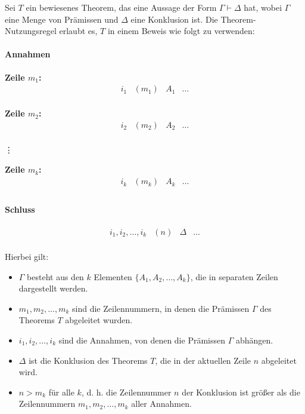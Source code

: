 \documentclass[main.tex]{subfiles}
\begin{document}
\begin{definition}
\label{theoremUsageRule}
Sei \( T \) ein bewiesenes Theorem, das eine Aussage der Form \( \Gamma \vdash \Delta \) hat, wobei \( \Gamma \) eine Menge von Prämissen und \( \Delta \) eine Konklusion ist. Die Theorem-Nutzungsregel erlaubt es, \( T \) in einem Beweis wie folgt zu verwenden:

\paragraph{Annahmen}
\textbf{Zeile \(m_1\):}
\[
\begin{array}{llll}
   i_1& (m_1) & A_1 & \dots \\
\end{array}
\]

\textbf{Zeile \(m_2\):}
\[
\begin{array}{llll}
   i_2& (m_2) & A_2 & \dots \\
\end{array}
\]

\vdots

\textbf{Zeile \(m_k\):}
\[
\begin{array}{llll}
   i_k& (m_k) & A_k & \dots \\
\end{array}
\]

\paragraph{Schluss}
\[
\begin{array}{llll}
   i_1, i_2, \ldots, i_k & (n) & \Delta & ... \\
\end{array}
\]

Hierbei gilt:
\begin{itemize}
    \item \( \Gamma \) besteht aus den \( k \) Elementen \( \{A_1, A_2, \ldots, A_k\} \), die in separaten Zeilen dargestellt werden.
    \item \( m_1, m_2, \ldots, m_k \) sind die Zeilennummern, in denen die Prämissen \( \Gamma \) des Theorems \( T \) abgeleitet wurden.
    \item \( i_1, i_2, \ldots, i_k \) sind die Annahmen, von denen die Prämissen \( \Gamma \) abhängen.
    \item \( \Delta \) ist die Konklusion des Theorems \( T \), die in der aktuellen Zeile \( n \) abgeleitet wird.
    \item \( n > m_k \) für alle \( k \), d. h. die Zeilennummer \( n \) der Konklusion ist größer als die Zeilennummern \( m_1, m_2, \ldots, m_k \) aller Annahmen.
\end{itemize}
\end{definition}
\end{document}
